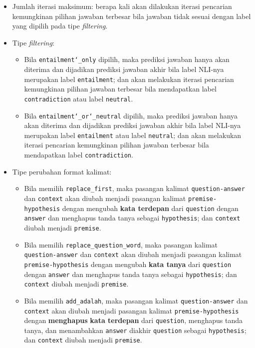 \begin{itemize}
    \item Jumlah iterasi maksimum: berapa kali akan dilakukan iterasi pencarian kemungkinan pilihan jawaban terbesar bila jawaban tidak sesuai dengan label yang dipilih pada tipe \emph{filtering}.
    
    \item Tipe \emph{filtering}:
    \begin{itemize}
        \item Bila \texttt{entailment\char`_only} dipilih, maka prediksi jawaban hanya akan diterima dan dijadikan prediksi jawaban akhir bila label NLI-nya merupakan label \texttt{entailment}; dan akan melakukan iterasi pencarian kemungkinan pilihan jawaban terbesar bila mendapatkan label \texttt{contradiction} atau label \texttt{neutral}.
        
        \item Bila \texttt{entailment\char`_or\char`_neutral} dipilih, maka prediksi jawaban hanya akan diterima dan dijadikan prediksi jawaban akhir bila label NLI-nya merupakan label \texttt{entailment} atau label \texttt{neutral}; dan akan melakukan iterasi pencarian kemungkinan pilihan jawaban terbesar bila mendapatkan label \texttt{contradiction}. 
    \end{itemize}
    
    \item Tipe perubahan format kalimat:
    \begin{itemize}
        \item Bila memilih \texttt{replace\_first}, maka pasangan kalimat \texttt{question-answer} dan \texttt{context} akan diubah menjadi pasangan kalimat \texttt{premise-hypothesis} dengan mengubah \textbf{kata terdepan} dari \texttt{question} dengan \texttt{answer} dan menghapus tanda tanya sebagai \texttt{hypothesis}; dan \texttt{context} diubah menjadi \texttt{premise}.
        
        \item Bila memilih \texttt{replace\_question\_word}, maka pasangan kalimat \texttt{question-answer} dan \texttt{context} akan diubah menjadi pasangan kalimat \texttt{premise-hypothesis} dengan mengubah \textbf{kata tanya} dari \texttt{question} dengan \texttt{answer} dan menghapus tanda tanya sebagai \texttt{hypothesis}; dan \texttt{context} diubah menjadi \texttt{premise}.
        
        \item  Bila memilih \texttt{add\_adalah}, maka pasangan kalimat \texttt{question-answer} dan \texttt{context} akan diubah menjadi pasangan kalimat \texttt{premise-hypothesis} dengan \textbf{menghapus} \textbf{kata terdepan} dari \texttt{question}, menghapus tanda tanya, dan menambahkan \texttt{answer} diakhir \texttt{question} sebagai \texttt{hypothesis}; dan \texttt{context} diubah menjadi \texttt{premise}.
        

\end{itemize}
\end{itemize}
